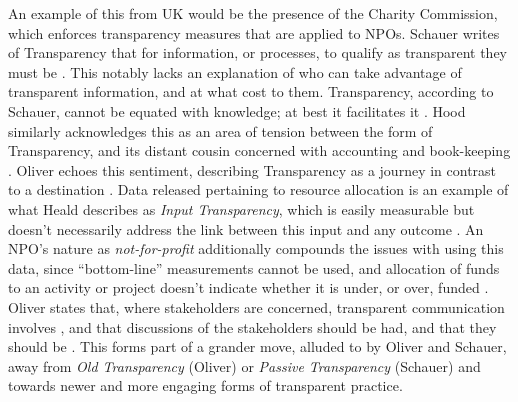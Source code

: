 %
 An example of this from UK would be the presence of the Charity Commission, which enforces transparency measures that are applied to NPOs. Schauer writes of Transparency that for information, or processes, to qualify as transparent they must be  \cite{schauer_transparency_2011}. This notably lacks an explanation of who can take advantage of transparent information, and at what cost to them. Transparency, according to Schauer, cannot be equated with knowledge; at best it facilitates it \cite{schauer_transparency_2011}. Hood similarly acknowledges this as an area of tension between the  form of Transparency, and its distant cousin concerned with accounting and book-keeping \cite{hood_transparency_2006-1}. Oliver echoes this sentiment, describing Transparency as a journey in contrast to a destination \cite{oliver_what_2004}.
%
Data released pertaining to resource allocation is an example of what Heald describes as \textit{Input Transparency}, which is easily measurable but doesn't necessarily address the link between this input and any outcome \cite{heald_fiscal_2003, heald_varieties_2006}. An NPO's nature as \textit{not-for-profit} additionally compounds the issues with using this data, since ``bottom-line'' measurements cannot be used, and allocation of funds to an activity or project doesn't indicate whether it is under, or over, funded \cite{henderson_performance_2002}. Oliver states that, where stakeholders are concerned, transparent communication involves , and that discussions of the stakeholders  should be had, and that they should be  \cite{oliver_what_2004}. This forms part of a grander move, alluded to by Oliver and Schauer, away from \textit{Old Transparency} (Oliver) or \textit{Passive Transparency} (Schauer) and towards newer and more engaging forms of transparent practice.

